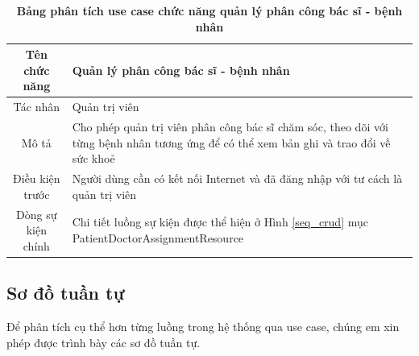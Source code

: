   \begin{table}[H]
    \caption{\bfseries \fontsize{12pt}{0pt}\selectfont Bảng phân tích use case chức năng quản lý phân công bác sĩ - bệnh nhân}
    \centering
    \begin{tabularx}{0.9\textwidth}{|c|X|}
      \hline
      \textbf{Tên chức năng} & \textbf{Quản lý phân công bác sĩ - bệnh nhân} \\
      \hline
      Tác nhân & Quản trị viên \\
      \hline
      Mô tả & Cho phép quản trị viên phân công bác sĩ chăm sóc, theo dõi với từng bệnh nhân tương ứng để có thể xem bản ghi
      và trao đổi về sức khoẻ \\
      \hline
      Điều kiện trước & Người dùng cần có kết nối Internet và đã đăng nhập với tư cách là quản trị viên \\
      \hline
      Dòng sự kiện chính & 
        Chi tiết luồng sự kiện được thể hiện ở Hình \ref{seq_crud} mục PatientDoctorAssignmentResource\\
      \hline
    \end{tabularx}
  \end{table}

\subsection{Sơ đồ tuần tự}
Để phân tích cụ thể hơn từng luồng trong hệ thống qua use case, chúng em xin phép được trình bày các sơ đồ tuần
tự. 
